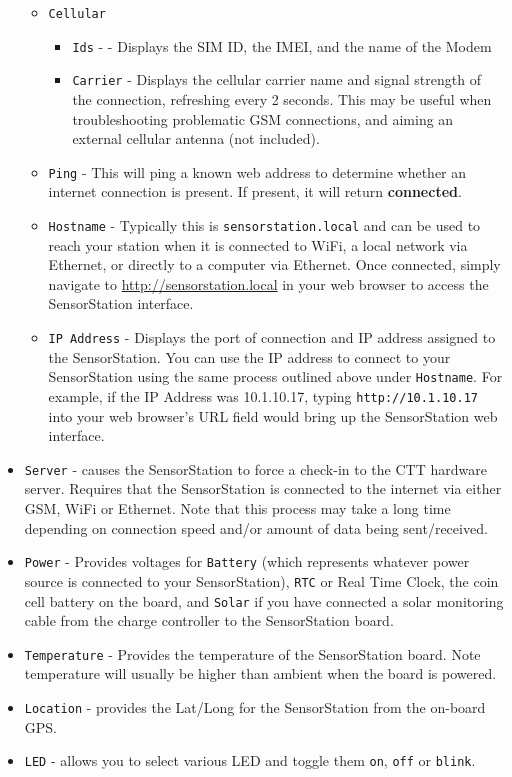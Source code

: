 \documentclass[
]{article}
\providecommand{\tightlist}{%
  \setlength{\itemsep}{0pt}\setlength{\parskip}{0pt}}
\begin{document}
\begin{itemize}
  \begin{itemize}
  \tightlist
  \item
    \texttt{Cellular}

    \begin{itemize}
    \tightlist
    \item
      \texttt{Ids} - - Displays the SIM ID, the IMEI, and the name of
      the Modem
    \item
      \texttt{Carrier} - Displays the cellular carrier name and signal
      strength of the connection, refreshing every 2 seconds. This may
      be useful when troubleshooting problematic GSM connections, and
      aiming an external cellular antenna (not included).
    \end{itemize}
  \item
    \texttt{Ping} - This will ping a known web address to determine
    whether an internet connection is present. If present, it will
    return \textbf{connected}.
  \item
    \texttt{Hostname} - Typically this is \texttt{sensorstation.local}
    and can be used to reach your station when it is connected to WiFi,
    a local network via Ethernet, or directly to a computer via
    Ethernet. Once connected, simply navigate to
    \url{http://sensorstation.local} in your web browser to access the
    SensorStation interface.
  \item
    \texttt{IP\ Address} - Displays the port of connection and IP
    address assigned to the SensorStation. You can use the IP address to
    connect to your SensorStation using the same process outlined above
    under \texttt{Hostname}. For example, if the IP Address was
    10.1.10.17, typing \texttt{http://10.1.10.17} into your web
    browser's URL field would bring up the SensorStation web interface.
  \end{itemize}
\item
  \texttt{Server} - causes the SensorStation to force a check-in to the
  CTT hardware server. Requires that the SensorStation is connected to
  the internet via either GSM, WiFi or Ethernet. Note that this process
  may take a long time depending on connection speed and/or amount of
  data being sent/received.
\item
  \texttt{Power} - Provides voltages for \texttt{Battery} (which
  represents whatever power source is connected to your SensorStation),
  \texttt{RTC} or Real Time Clock, the coin cell battery on the board,
  and \texttt{Solar} if you have connected a solar monitoring cable from
  the charge controller to the SensorStation board.
\item
  \texttt{Temperature} - Provides the temperature of the SensorStation
  board. Note temperature will usually be higher than ambient when the
  board is powered.
\item
  \texttt{Location} - provides the Lat/Long for the SensorStation from
  the on-board GPS.
\item
  \texttt{LED} - allows you to select various LED and toggle them
  \texttt{on}, \texttt{off} or \texttt{blink}.


\end{itemize}
\end{document}
